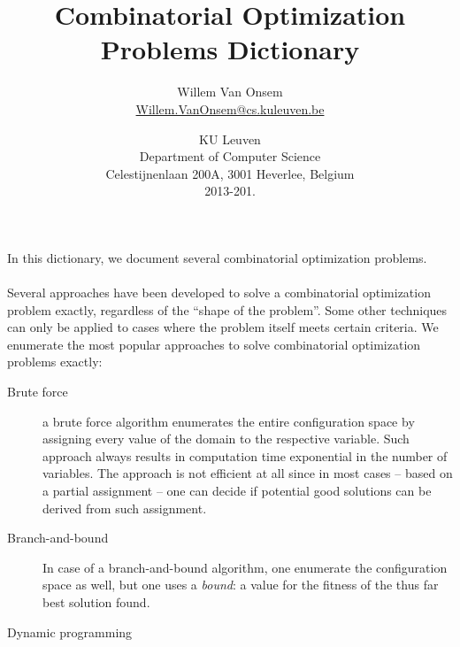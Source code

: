 \documentclass{../SharedData/dictionaryclass}
\title{Combinatorial Optimization Problems Dictionary}
\author{Willem Van Onsem\\\href{mailto:Willem.VanOnsem@cs.kuleuven.be}{Willem.VanOnsem@cs.kuleuven.be}}
\date{KU Leuven\\Department of Computer Science\\Celestijnenlaan 200A, 3001 Heverlee, Belgium\\2013-201.}
\newcommand{\nmn}[1]{\emph{#1}}
\begin{document}
\clearpage{}
In this dictionary, we document several combinatorial optimization problems.
\paragraph{}
Several approaches have been developed to solve a combinatorial optimization problem exactly, regardless of the ``shape of the problem''. Some other techniques can only be applied to cases where the problem itself meets certain criteria. We enumerate the most popular approaches to solve combinatorial optimization problems exactly:
\begin{description}
 \item [Brute force] a brute force algorithm enumerates the entire configuration space by assigning every value of the domain to the respective variable. Such approach always results in computation time exponential in the number of variables. The approach is not efficient at all since in most cases -- based on a partial assignment -- one can decide if potential good solutions can be derived from such assignment.
 \item [Branch-and-bound] In case of a branch-and-bound algorithm, one enumerate the configuration space as well, but one uses a \nmn{bound}: a value for the fitness of the thus far best solution found.
 \item [Dynamic programming]
\end{description}
\glsaddall
\printglossaries
\end{document}

